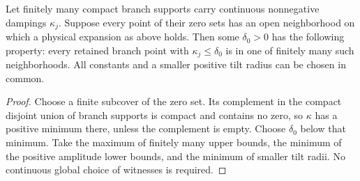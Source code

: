 \begin{lemma}
\label{lem:v59-witness-cover}
Let finitely many compact branch supports carry continuous nonnegative
dampings $\kappa_j$. Suppose every point of their zero sets has an open
neighborhood on which a physical expansion as above holds. Then some
$\delta_0>0$ has the following property: every retained branch point with
$\kappa_j\le\delta_0$ is in one of finitely many such neighborhoods.
All constants and a smaller positive tilt radius can be chosen in common.
\end{lemma}
\begin{proof}
Choose a finite subcover of the zero set. Its complement in the compact
disjoint union of branch supports is compact and contains no zero, so
$\kappa$ has a positive minimum there, unless the complement is empty.
Choose $\delta_0$ below that minimum. Take the maximum of finitely many
upper bounds, the minimum of the positive amplitude lower bounds, and
the minimum of smaller tilt radii. No continuous global choice of
witnesses is required.
\end{proof}

